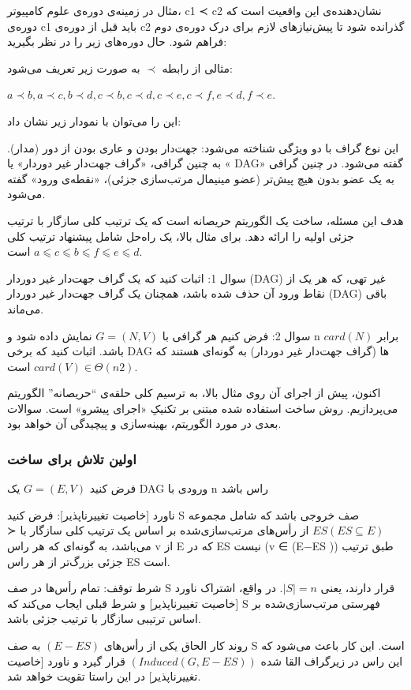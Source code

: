 \documentclass{book} %
\begin{document}
مثال
در زمینه‌ی دوره‌ی علوم کامپیوتر، c1 ≺ c2 نشان‌دهنده‌ی این واقعیت است که دوره‌ی c1 باید
قبل از دوره‌ی c2 گذرانده شود تا پیش‌نیازهای لازم برای درک دوره‌ی دوم فراهم شود.
حال دوره‌های زیر را در نظر بگیرید:


مثالی از رابطه $≺$ به صورت زیر تعریف می‌شود:

$a ≺ b, a ≺ c, b ≺ d, c ≺ b, c ≺ d, c ≺ e, c ≺ f, e ≺ d, f ≺ e$.

این را می‌توان با نمودار زیر نشان داد:

این نوع گراف با دو ویژگی شناخته می‌شود: جهت‌دار بودن و عاری بودن از دور
(مدار). به چنین گرافی، «گراف جهت‌دار غیر دوردار» یا « DAG» گفته می‌شود. در چنین
گرافی به یک عضو بدون هیچ پیش‌تر (عضو مینیمال مرتب‌سازی جزئی)، «نقطه‌ی ورود»
گفته می‌شود.

هدف این مسئله، ساخت یک الگوریتم حریصانه است که یک ترتیب کلی سازگار با ترتیب جزئی اولیه را ارائه دهد. برای مثال بالا، یک راه‌حل شامل پیشنهاد ترتیب کلی $a ⩽ c ⩽ b ⩽ f ⩽ e ⩽ d$ است.

سوال 1: اثبات کنید که یک گراف جهت‌دار غیر دوردار (DAG) غیر تهی، که هر یک از نقاط ورود آن حذف
شده باشد، همچنان یک گراف جهت‌دار غیر دوردار (DAG) باقی می‌ماند.


سوال 2: فرض کنیم هر گرافی با $G = (N, V)$ نمایش داده شود و n برابر $card(N)$ باشد.
اثبات کنید که برخی DAG ها (گراف جهت‌دار غیر دوردار) به گونه‌ای هستند که $card(V) ∈ Θ(n2)$
است.

اکنون، پیش از اجرای آن روی مثال بالا، به ترسیم کلی حلقه‌ی “حریصانه” الگوریتم می‌پردازیم.
روش ساخت استفاده شده مبتنی بر تکنیکِ «اجرای پیشرو» است. سوالات بعدی در مورد
الگوریتم، بهینه‌سازی و پیچیدگی آن خواهد بود.

\newpage

\subsubsection*{اولین تلاش برای ساخت}
فرض کنید $G = (E, V)$ یک DAG ورودی با n راس باشد

ناورد [خاصیت تغییرناپذیر]: فرض کنید S صف خروجی باشد که شامل مجموعه $ES (ES ⊆ E)$ از رأس‌های مرتب‌سازی‌شده بر اساس یک ترتیب کلی سازگار با ≺  می‌باشد، به گونه‌ای که هر راس v از E که در ES نیست (v ∈ (E−ES )) طبق ترتیب جزئی بزرگ‌تر از هر راس ES است.

شرط توقف: تمام رأس‌ها در صف S قرار دارند، یعنی $|S| = n$.
در واقع، اشتراک ناورد [خاصیت تغییرناپذیر] و شرط قبلی ایجاب می‌کند که S
فهرستی مرتب‌سازی‌شده بر اساس ترتیبی سازگار با ترتیب جزئی باشد.

روند کار الحاق یکی از رأس‌های $(E − ES )$ به صف S است.
این کار باعث می‌شود که این راس در زیرگراف القا شده $(Induced(G, E − ES ))$ قرار گیرد
و ناورد [خاصیت تغییرناپذیر] در این راستا تقویت خواهد شد.
\end{document}
